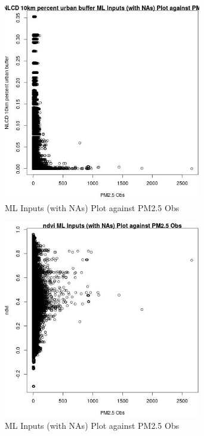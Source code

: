 \begin{figure} 
\centering  
\includegraphics[width=0.77\textwidth]{Code_Outputs/Report_ML_input_PM25_Step4_part_e_de_duplicated_aves_compiled_2019-05-21wNAs_NLCD_10km_percent_urban_buffervPM25_Obs.jpg} 
\caption{\label{fig:Report_ML_input_PM25_Step4_part_e_de_duplicated_aves_compiled_2019-05-21wNAsNLCD_10km_percent_urban_buffervPM25_Obs}ML Inputs (with NAs) Plot against PM2.5 Obs} 
\end{figure} 
 

\clearpage 

\begin{figure} 
\centering  
\includegraphics[width=0.77\textwidth]{Code_Outputs/Report_ML_input_PM25_Step4_part_e_de_duplicated_aves_compiled_2019-05-21wNAs_ndvivPM25_Obs.jpg} 
\caption{\label{fig:Report_ML_input_PM25_Step4_part_e_de_duplicated_aves_compiled_2019-05-21wNAsndvivPM25_Obs}ML Inputs (with NAs) Plot against PM2.5 Obs} 
\end{figure} 
 
